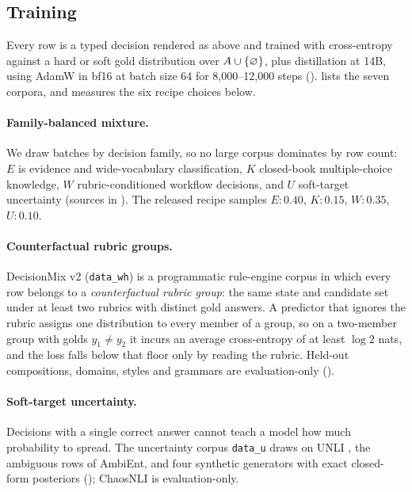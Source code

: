 \subsection{Training}
\label{sec:train}

Every row is a typed decision rendered as above and trained with cross-entropy against a hard or soft
gold distribution over $A \cup \{\varnothing\}$, plus distillation at 14B, using AdamW in bf16 at batch
size 64 for 8{,}000--12{,}000 steps ().  lists the seven corpora,
and  measures the six recipe choices below.

\paragraph{Family-balanced mixture.}
\label{sec:train:mixture}
We draw batches by decision family, so no large corpus dominates by row count: $E$ is evidence and
wide-vocabulary classification, $K$ closed-book multiple-choice knowledge, $W$ rubric-conditioned
workflow decisions, and $U$ soft-target uncertainty (sources in ). The released
recipe samples $E{:}0.40$, $K{:}0.15$, $W{:}0.35$, $U{:}0.10$.

\paragraph{Counterfactual rubric groups.}
\label{sec:train:rubric}
DecisionMix v2 (\texttt{data\_wh}) is a programmatic rule-engine corpus in which every row belongs to a
\emph{counterfactual rubric group}: the same state and candidate set under at least two rubrics with
distinct gold answers. A predictor that ignores the rubric assigns one distribution to every member of a
group, so on a two-member group with golds $y_1 \neq y_2$ it incurs an average cross-entropy of at least
$\log 2$ nats, and the loss falls below that floor only by reading the rubric. Held-out compositions,
domains, styles and grammars are evaluation-only ().

\paragraph{Soft-target uncertainty.}
\label{sec:train:uncertainty}
Decisions with a single correct answer cannot teach a model how much probability to spread. The
uncertainty corpus \texttt{data\_u} draws on UNLI \citep{chen2020unli}, the ambiguous rows of AmbiEnt,
and four synthetic generators with exact closed-form posteriors (); ChaosNLI
\citep{nie2020chaosnli} is evaluation-only.

